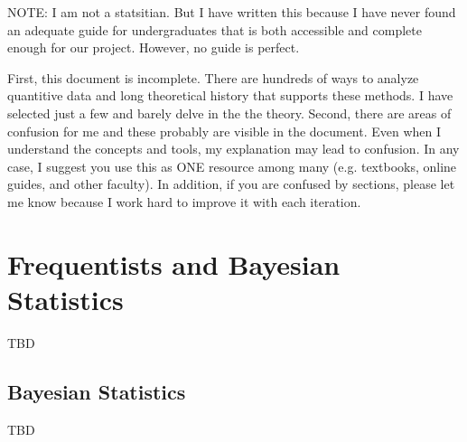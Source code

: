 \documentclass{article}\usepackage[]{graphicx}\usepackage[]{color}
\begin{document}
NOTE: I am not a statsitian. But I have written this because I have never found an adequate guide for undergraduates that is both accessible and complete enough for our project. However, no guide is perfect.

First, this document is incomplete. There are hundreds of ways to analyze quantitive data and long theoretical history that supports these methods. I have selected just a few and barely delve in the the theory. Second, there are areas of confusion for me and these probably are visible in the document. Even when I understand the concepts and tools, my explanation may lead to confusion. In any case, I suggest you use this as ONE resource among many (e.g. textbooks, online guides, and other faculty). In addition, if you are confused by sections, please let me know because I work hard to improve it with each iteration. 

\section{Frequentists and Bayesian Statistics}

TBD




\subsection{Bayesian Statistics}

TBD

\end{document}
